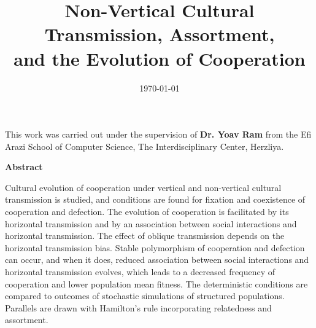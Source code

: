 \documentclass[12pt]{extarticle}
\title{Non-Vertical Cultural Transmission, Assortment, \\and the Evolution of Cooperation}
\date{\today}
\begin{document}
\maketitle


\pagebreak
{\large This work was carried out under the supervision of \textbf{Dr. Yoav Ram} from the Efi Arazi School of Computer Science, The Interdisciplinary Center, Herzliya.}
\pagebreak

{\huge \begin{center} \textbf{Abstract} \end{center}}

Cultural evolution of cooperation under vertical and non-vertical cultural transmission is studied, and conditions are found for fixation and coexistence of cooperation and defection. 
The evolution of cooperation is facilitated by its horizontal transmission and by an association between social interactions and horizontal transmission.
The effect of oblique transmission depends on the horizontal transmission bias.
Stable polymorphism of cooperation and defection can occur, and
when it does, reduced association between social interactions and horizontal transmission evolves, which leads to a decreased frequency of cooperation and lower population mean fitness.
The deterministic conditions are compared to outcomes of stochastic simulations of structured populations.
Parallels are drawn with Hamilton's rule incorporating relatedness and assortment.

\pagebreak

\tableofcontents
\pagebreak


\end{document}
